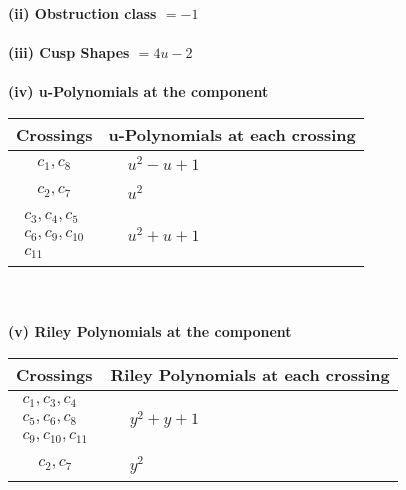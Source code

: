 \documentclass[1p]{elsarticle_modified}
\theoremstyle{definition}
\begin{document}
\flushleft \textbf{(ii) Obstruction class $= -1$}\\~\\
\flushleft \textbf{(iii) Cusp Shapes $= 4 u-2$}\\~\\
\newpage\renewcommand{\arraystretch}{1}
\flushleft \textbf{(iv) u-Polynomials at the component}\newline \\
\begin{tabular}{m{50pt}|m{274pt}}
Crossings & \hspace{64pt}u-Polynomials at each crossing \\
\hline $$\begin{aligned}c_{1},c_{8}\end{aligned}$$&$\begin{aligned}
&u^2- u+1
\end{aligned}$\\
\hline $$\begin{aligned}c_{2},c_{7}\end{aligned}$$&$\begin{aligned}
&u^2
\end{aligned}$\\
\hline $$\begin{aligned}c_{3},c_{4},c_{5}\\c_{6},c_{9},c_{10}\\c_{11}\end{aligned}$$&$\begin{aligned}
&u^2+u+1
\end{aligned}$\\
\hline
\end{tabular}\\~\\
\newpage\renewcommand{\arraystretch}{1}
\flushleft \textbf{(v) Riley Polynomials at the component}\newline \\
\begin{tabular}{m{50pt}|m{274pt}}
Crossings & \hspace{64pt}Riley Polynomials at each crossing \\
\hline $$\begin{aligned}c_{1},c_{3},c_{4}\\c_{5},c_{6},c_{8}\\c_{9},c_{10},c_{11}\end{aligned}$$&$\begin{aligned}
&y^2+y+1
\end{aligned}$\\
\hline $$\begin{aligned}c_{2},c_{7}\end{aligned}$$&$\begin{aligned}
&y^2
\end{aligned}$\\
\hline
\end{tabular}\\~\\
\end{document}
